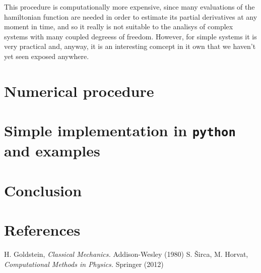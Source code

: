 \documentclass{iopart}
\begin{document}
This procedure is computationally more expensive, since many evaluations of the
hamiltonian function are needed in order to estimate its partial derivatives at
any moment in time, and so it really is not suitable to the analisys of complex
systems with many coupled degreess of freedom. However, for simple systems it is
very practical and, anyway, it is an interesting comcept in it own that we
haven't yet seen exposed anywhere.

\section{Numerical procedure}
\section{Simple implementation in \texttt{python} and examples}
\section{Conclusion}

\section*{References}
\begin{thebibliography}{99}
   H. Goldstein, \textsl{Classical Mechanics.} Addison-Wesley
  (1980)
   S. \v{S}irca, M. Horvat, \textsl{Computational Methods in
  Physics.} Springer (2012)
\end{thebibliography}
\end{document}
